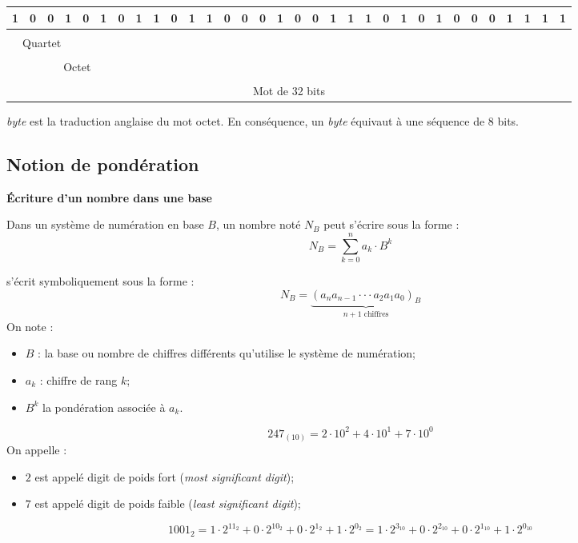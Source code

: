 \documentclass[10pt,fleqn]{article} %
\begin{document}

\footnotesize{
\begin{center}
\begin{tabular}{|cccc|cccc|cccc|cccc|cccc|cccc|cccc|cccc|}
\hline
1&0&0&1&0&1&0&1&1&0&1&1&0&0&0&1&0&0&1&1&1&0&1&0&1&0&0&0&1&1&1&1\\
\hline
\multicolumn{32}{c}{} \\
\multicolumn{4}{|c|}{Quartet} & \multicolumn{28}{c}{} \\
\cline{0-3}
\multicolumn{32}{c}{} \\
\multicolumn{8}{|c|}{Octet} & \multicolumn{24}{c}{} \\
\cline{0-7}
\multicolumn{32}{c}{} \\
\multicolumn{32}{|c|}{Mot de 32 bits} \\
\hline
\end{tabular}
\end{center}
}
\begin{rem}
\textit{byte} est la traduction anglaise du mot octet. En conséquence, un \textit{byte} équivaut à une séquence de 8 bits.
\end{rem}


\subsection{Notion de pondération}
\begin{defi}
\textbf{Écriture d'un nombre dans une base}

Dans un système de numération en base $B$, un nombre noté $N_B$ peut s'écrire sous la forme :
$$
N_B = \sum\limits_{k=0}^{n} a_k \cdot B^k
$$

s'écrit symboliquement sous la forme : 
$$
N_B = \underbrace{\left(a_n a_{n-1} \cdot \cdot \cdot a_2 a_1 a_0\right)_B}_{n+1 \text{ chiffres}}
$$
On note : 
\begin{itemize}
\item $B$ : la base ou nombre de chiffres différents qu'utilise le système de numération;
\item $a_k$ : chiffre de rang $k$;
\item $B^k$ la pondération associée à $a_k$.
\end{itemize}

\end{defi}

\begin{exemple}
$$247_{(10)} = 2\cdot 10^2 + 4\cdot 10^1 + 7\cdot 10^0$$
On appelle : 
\begin{itemize}
\item $2$ est appelé digit de poids fort (\textit{most significant digit});
\item $7$ est appelé digit de poids faible (\textit{least significant digit});
\end{itemize}

$$
1001_2 = 1\cdot 2^{11_2} + 0\cdot 2^{10_2} + 0\cdot 2^{1_2} + 1\cdot 2^{0_2} 
= 1\cdot 2^{3_{10}} + 0\cdot 2^{2_{10}} + 0\cdot 2^{1_{10}} + 1\cdot 2^{0_{10}}
$$
\end{exemple}
\end{document}
